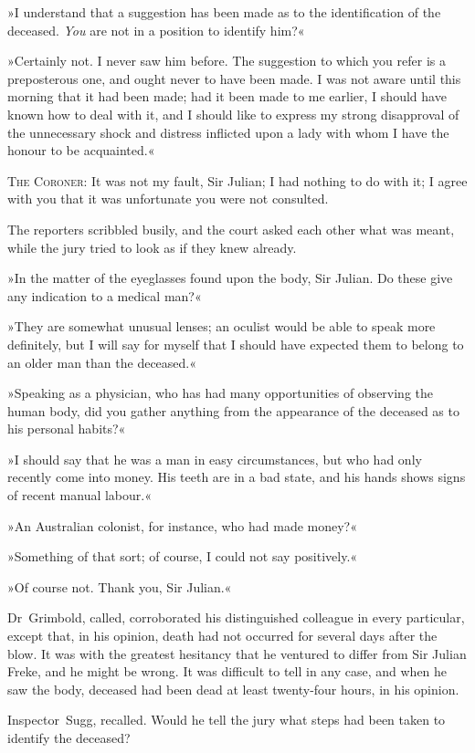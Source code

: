 »I understand that a suggestion has been made as to the identification of the deceased. \textit{You} are not in a position to identify him?«

»Certainly not. I never saw him before. The suggestion to which you refer is a preposterous one, and ought never to have been made. I was not aware until this morning that it had been made; had it been made to me earlier, I should have known how to deal with it, and I should like to express my strong disapproval of the unnecessary shock and distress inflicted upon a lady with whom I have the honour to be acquainted.«

\textsc{The Coroner}: It was not my fault, Sir Julian; I had nothing to do with it; I agree with you that it was unfortunate you were not consulted.

The reporters scribbled busily, and the court asked each other what was meant, while the jury tried to look as if they knew already.

»In the matter of the eyeglasses found upon the body, Sir Julian. Do these give any indication to a medical man?«

»They are somewhat unusual lenses; an oculist would be able to speak more definitely, but I will say for myself that I should have expected them to belong to an older man than the deceased.«

»Speaking as a physician, who has had many opportunities of observing the human body, did you gather anything from the appearance of the deceased as to his personal habits?«

»I should say that he was a man in easy circumstances, but who had only recently come into money. His teeth are in a bad state, and his hands shows signs of recent manual labour.«

»An Australian colonist, for instance, who had made money?«

»Something of that sort; of course, I could not say positively.«

»Of course not. Thank you, Sir Julian.«

Dr~Grimbold, called, corroborated his distinguished colleague in every particular, except that, in his opinion, death had not occurred for several days after the blow. It was with the greatest hesitancy that he ventured to differ from Sir Julian Freke, and he might be wrong. It was difficult to tell in any case, and when he saw the body, deceased had been dead at least twenty-four hours, in his opinion.

Inspector~Sugg, recalled. Would he tell the jury what steps had been taken to identify the deceased?

